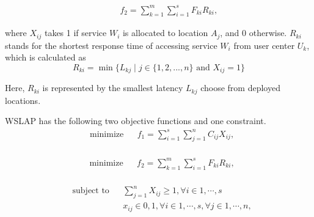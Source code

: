 \documentclass[10pt,journal,compsoc]{IEEEtran}
\begin{document}
\begin{equation} \label{eq:fit-latency}
\begin{aligned}
& & & f_2 = \sum\limits_{k=1}^m \sum\limits_{i=1}^s F_{ki} R_{ki},
\end{aligned}
\end{equation}

\noindent where $X_{ij}$ takes 1 if service $W_i$ is allocated to location $A_j$, and 0 otherwise. $R_{ki}$ stands for the shortest response time of accessing service $W_i$ from user center $U_k$, which is calculated as
 \begin{equation}
 \label{eq:response}
  R_{ki} = \min\{L_{kj} \mid j \in \{1, 2, ..., n\} \text{ and } X_{ij} = 1\}
 \end{equation}

Here, $R_{ki}$ is represented by the smallest latency $L_{kj}$ choose from deployed locations.

WSLAP has the following two objective functions and one constraint.
\begin{equation} \label{eq:cost}
\begin{aligned}
& {\text{minimize}}
& &  f_1 = \sum\limits_{i=1}^s \sum\limits_{j = 1}^n C_{ij} X_{ij},\\
\end{aligned}
\end{equation}


\begin{equation}
\begin{aligned} \label{eq:latency}
& {\text{minimize}}
& & f_2 = \sum\limits_{k=1}^m \sum\limits_{i=1}^s F_{ki} R_{ki},\\
\end{aligned}
\end{equation}

\begin{equation} \label{eq:constraint}
\begin{aligned}
& \text{subject to}
& &  \sum_{j=1}^n X_{ij} \geqslant 1, \forall i \in {1, \cdots, s}\\
& & & x_{ij} \in {0, 1}, \forall i \in {1, \cdots, s}, \forall j \in {1, \cdots, n},
\end{aligned}
\end{equation}


\end{document}
